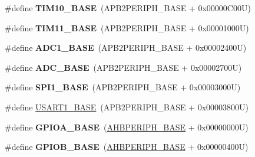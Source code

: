 \begin{DoxyCompactItemize}
\item 
\hypertarget{group___peripheral__memory__map_ga3eff32f3801db31fb4b61d5618cad54a}{\#define {\bfseries T\-I\-M10\-\_\-\-B\-A\-S\-E}~(A\-P\-B2\-P\-E\-R\-I\-P\-H\-\_\-\-B\-A\-S\-E + 0x00000\-C00\-U)}\label{group___peripheral__memory__map_ga3eff32f3801db31fb4b61d5618cad54a}

\item 
\hypertarget{group___peripheral__memory__map_ga3a4a06bb84c703084f0509e105ffaf1d}{\#define {\bfseries T\-I\-M11\-\_\-\-B\-A\-S\-E}~(A\-P\-B2\-P\-E\-R\-I\-P\-H\-\_\-\-B\-A\-S\-E + 0x00001000\-U)}\label{group___peripheral__memory__map_ga3a4a06bb84c703084f0509e105ffaf1d}

\item 
\hypertarget{group___peripheral__memory__map_ga695c9a2f892363a1c942405c8d351b91}{\#define {\bfseries A\-D\-C1\-\_\-\-B\-A\-S\-E}~(A\-P\-B2\-P\-E\-R\-I\-P\-H\-\_\-\-B\-A\-S\-E + 0x00002400\-U)}\label{group___peripheral__memory__map_ga695c9a2f892363a1c942405c8d351b91}

\item 
\hypertarget{group___peripheral__memory__map_gad06cb9e5985bd216a376f26f22303cd6}{\#define {\bfseries A\-D\-C\-\_\-\-B\-A\-S\-E}~(A\-P\-B2\-P\-E\-R\-I\-P\-H\-\_\-\-B\-A\-S\-E + 0x00002700\-U)}\label{group___peripheral__memory__map_gad06cb9e5985bd216a376f26f22303cd6}

\item 
\hypertarget{group___peripheral__memory__map_ga50cd8b47929f18b05efbd0f41253bf8d}{\#define {\bfseries S\-P\-I1\-\_\-\-B\-A\-S\-E}~(A\-P\-B2\-P\-E\-R\-I\-P\-H\-\_\-\-B\-A\-S\-E + 0x00003000\-U)}\label{group___peripheral__memory__map_ga50cd8b47929f18b05efbd0f41253bf8d}

\item 
\#define \hyperlink{group___peripheral__memory__map_ga86162ab3f740db9026c1320d46938b4d}{U\-S\-A\-R\-T1\-\_\-\-B\-A\-S\-E}~(A\-P\-B2\-P\-E\-R\-I\-P\-H\-\_\-\-B\-A\-S\-E + 0x00003800\-U)
\item 
\hypertarget{group___peripheral__memory__map_gad7723846cc5db8e43a44d78cf21f6efa}{\#define {\bfseries G\-P\-I\-O\-A\-\_\-\-B\-A\-S\-E}~(\hyperlink{group___peripheral__memory__map_ga92eb5d49730765d2abd0f5b09548f9f5}{A\-H\-B\-P\-E\-R\-I\-P\-H\-\_\-\-B\-A\-S\-E} + 0x00000000\-U)}\label{group___peripheral__memory__map_gad7723846cc5db8e43a44d78cf21f6efa}

\item 
\hypertarget{group___peripheral__memory__map_gac944a89eb789000ece920c0f89cb6a68}{\#define {\bfseries G\-P\-I\-O\-B\-\_\-\-B\-A\-S\-E}~(\hyperlink{group___peripheral__memory__map_ga92eb5d49730765d2abd0f5b09548f9f5}{A\-H\-B\-P\-E\-R\-I\-P\-H\-\_\-\-B\-A\-S\-E} + 0x00000400\-U)}\label{group___peripheral__memory__map_gac944a89eb789000ece920c0f89cb6a68}


\end{DoxyCompactItemize}
